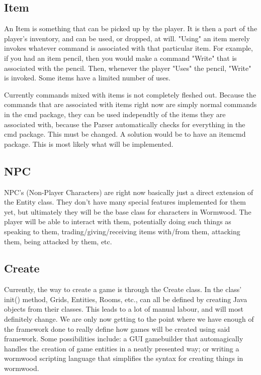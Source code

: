 \documentclass[12pt]{report}
\begin{document}
\subsection{Item}
An Item is something that can be picked up by the player. It is then a part of
the player's inventory, and can be used, or dropped, at will. "Using" an item
merely invokes whatever command is associated with that particular item. For
example, if you had an item pencil, then you would make a command "Write" that
is associated with the pencil. Then, whenever the player "Uses" the pencil,
"Write" is invoked. Some items have a limited number of uses.

Currently commands mixed with items is not completely fleshed out. Because 
the commands that are associated with items right now are simply normal 
commands in the cmd package, they can be used independtly of the items they
are associated with, because the Parser automatically checks for everything
in the cmd package. This must be changed. A solution would be to have an
itemcmd package. This is most likely what will be implemented.

\subsection{NPC}
NPC's (Non-Player Characters) are right now basically just a direct extension of the Entity class.
They don't have many special features implemented for them yet, but ultimately
they will be the base class for characters in Wormwood. The player will be
able to interact with them, potentially doing such things as speaking to them,
trading/giving/receiving items with/from them, attacking them, being attacked
by them, etc.

\subsection{Create}
Currently, the way to create a game is through the Create class. In the class'
init() method, Grids, Entities, Rooms, etc., can all be defined by creating
Java objects from their classes. This leads to a lot of manual labour, and
will most definitely change. We are only now getting to the point where
we have enough of the framework done to really define how games will be 
created using said framework. Some possibilities include: a GUI
gamebuilder that automagically handles the creation of game entities in 
a neatly presented way; or writing a wormwood scripting language that simplifies
the syntax for creating things in wormwood. 
\end{document}
